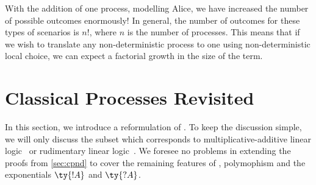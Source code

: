 \documentclass[UKenglish]{llncs}
\begin{document}
\begin{center}
\end{center}
With the addition of one process, modelling Alice, we have increased the number
of possible outcomes enormously! In general, the number of outcomes for these
types of scenarios is $n!$, where $n$ is the number of processes. This means
that if we wish to translate any non-deterministic process to one using
non-deterministic local choice, we can expect a factorial growth in the size of
the term.

\section{Classical Processes Revisited}\label{sec:cp-revisited}

In this section, we introduce a reformulation of \cp.
To keep the discussion simple, we will only discuss the subset which corresponds
to multiplicative-additive linear logic~\cite[MALL]{girard1987} or rudimentary
linear logic~\cite[RLL]{girard1992}.
We foresee no problems in extending the proofs from \cref{sec:cpnd} to
cover the remaining features of \cp, polymophism and the exponentials $\ty{!A}$
and $\ty{?A}$. 
\end{document}
